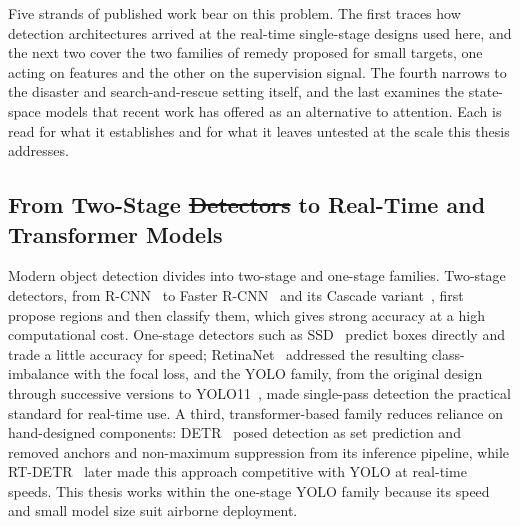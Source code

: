 \documentclass[12pt,a4paper,oneside]{report}
\providecommand{\DIFdel}[1]{{\protect\color{red}\sout{#1}}}                      %
\providecommand{\DIFdelbegin}{} %
\providecommand{\DIFdelend}{} %
\begin{document}
Five strands of published work bear on this problem. The first traces how
detection architectures arrived at the real-time single-stage designs used here,
and the next two cover the two families of remedy proposed for small targets,
one acting on features and the other on the supervision signal. The fourth
narrows to the disaster and search-and-rescue setting itself, and the last
examines the state-space models that recent work has offered as an alternative
to attention. Each is read for what it establishes and for what it leaves
untested at the scale this thesis addresses.

\subsection{From Two-Stage \DIFdelbegin \DIFdel{Detectors }\DIFdelend to Real-Time and Transformer Models}
Modern object detection divides into two-stage and one-stage families. Two-stage
detectors, from R-CNN~\cite{girshick2014rcnn} to Faster R-CNN~\cite{ren2015fasterrcnn}
and its Cascade variant~\cite{cai2018cascade}, first propose regions and then
classify them, which gives strong accuracy at a high computational cost. One-stage
detectors such as SSD~\cite{liu2016ssd} predict boxes directly and trade a little
accuracy for speed; RetinaNet~\cite{lin2017focal} addressed the resulting
class-imbalance with the focal loss, and the YOLO family, from the original
design~\cite{redmon2016yolo} through successive versions
\cite{wang2023yolov7,
jocher2023yolov8,wang2024yolov9,wang2024yolov10}
to YOLO11~\cite{jocher2024yolo11}, made single-pass detection the practical standard
for real-time use. A third, transformer-based family reduces reliance on
hand-designed components: DETR~\cite{carion2020detr} posed detection as set
prediction and removed anchors and non-maximum suppression from its inference
pipeline, while RT-DETR~\cite{zhao2024rtdetr} later made this approach
competitive with YOLO at real-time speeds. This thesis works within the one-stage
YOLO family because its speed and small model size suit airborne deployment.
\end{document}
